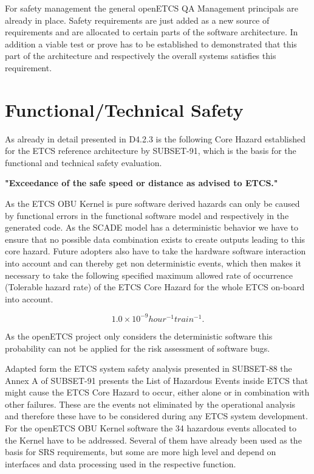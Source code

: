 \documentclass{template/openetcs_report}
\begin{document}
For safety management the general openETCS QA Management principals are already in place. Safety requirements are just added as a new source of requirements and are allocated to certain parts of the software architecture. In addition a viable test or prove has to be established to demonstrated that this part of the architecture and respectively the overall systems satisfies this requirement.  

\section{Functional/Technical Safety}

As already in detail presented in D4.2.3 is the following Core Hazard established for the ETCS reference architecture by SUBSET-91, which is the basis for the functional and technical safety evaluation.

\begin{center}
\textbf{"Exceedance of the safe speed or distance as advised to ETCS."}
\end{center}

As the ETCS OBU Kernel is pure software derived hazards can only be caused by functional errors in the functional software model and respectively in the generated code. As the SCADE model has a deterministic behavior we have to ensure that no possible data combination exists to create outputs leading to this core hazard. Future adopters also have to take the hardware software interaction into account and can thereby get non deterministic events, which then makes it necessary to take the following specified maximum allowed rate of occurrence (Tolerable hazard rate) of the ETCS Core Hazard for the whole ETCS on-board into account.

\[1.0\times10^{-9} hour^{-1} train^{-1}.\]

As the openETCS project only considers the deterministic software this probability can not be applied for the risk assessment of software bugs.

Adapted form the ETCS system safety analysis presented in SUBSET-88 the Annex A of SUBSET-91 presents the List of Hazardous Events inside ETCS that might cause the ETCS Core Hazard to occur, either alone or in combination with other failures. These are the events not eliminated by the operational analysis and therefore these have to be considered during any ETCS system development. For the openETCS OBU Kernel software the 34 hazardous events  allocated to the Kernel have to be addressed. Several of them have already been used as the basis for SRS requirements, but some are more high level and depend on interfaces and data processing used in the respective function.
\end{document}
